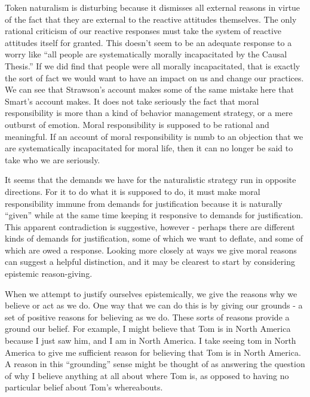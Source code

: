 \documentclass[phd,12pt,oneside,paper=letterpaper]{ubcthesis}
\begin{document}
Token naturalism is disturbing because it dismisses all external reasons in virtue of the fact that they are external to the reactive attitudes themselves. The only rational criticism of our reactive responses must take the system of reactive attitudes itself for granted. This doesn't seem to be an adequate response to a worry like ``all people are systematically morally incapacitated by the Causal Thesis.'' If we did find that people were all morally incapacitated, that is exactly the sort of fact we would want to have an impact on us and change our practices. We can see that Strawson's account makes some of the same mistake here that Smart's account makes. It does not take seriously the fact that moral responsibility is more than a kind of behavior management strategy, or a mere outburst of emotion. Moral responsibility is supposed to be rational and meaningful. If an account of moral responsibility is numb to an objection that we are systematically incapacitated for moral life, then it can no longer be said to take who we are seriously. 

It seems that the demands we have for the naturalistic strategy run in opposite directions. For it to do what it is supposed to do, it must make moral responsibility immune from demands for justification because it is naturally ``given'' while at the same time keeping it responsive to demands for justification. This apparent contradiction is suggestive, however - perhaps there are different kinds of demands for justification, some of which we want to deflate, and some of which are owed a response. Looking more closely at ways we give moral reasons can suggest a helpful distinction, and it may be clearest to start by considering epistemic reason-giving. 

When we attempt to justify ourselves epistemically, we give the reasons why we believe or act as we do. One way that we can do this is by giving our grounds - a set of positive reasons for believing as we do. These sorts of reasons provide a ground our belief. For example, I might believe that Tom is in North America because I just saw him, and I am in North America. I take seeing tom in North America to give me sufficient reason for believing that Tom is in North America. A reason in this ``grounding'' sense might be thought of as answering the question of why I believe anything at all about where Tom is, as opposed to having no particular belief about Tom's whereabouts.
\end{document}
